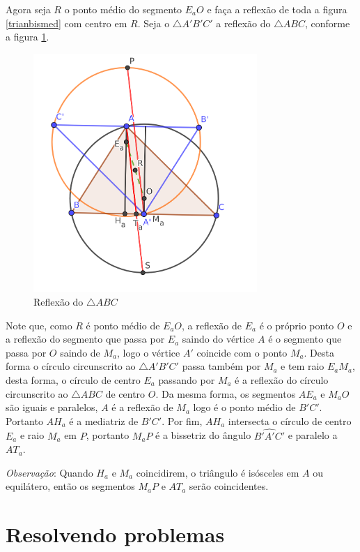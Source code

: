 \documentclass[12pt, openright, a4paper, brazil, openany, oneside]{abntex2}
\begin{document}
Agora seja $R$ o ponto médio do segmento $E_{a}O$ e faça a reflexão de toda a figura \ref{trianbismed} com centro em $R$. Seja o  $\triangle A'B'C'$ a reflexão do $\triangle ABC$, conforme a figura \ref{trianref}.

\begin{figure}[h]
	
	\center
	
	\includegraphics[width=8.5cm]{trianreflexao.png}
	\caption{Reflexão do $\triangle ABC$ \label{trianref}}
	
\end{figure}

Note que, como $R$ é ponto médio de $E_{a}O$, a reflexão de $E_a$ é o próprio ponto $O$ e a reflexão do segmento que passa por $E_a$ saindo do vértice $A$ é o segmento que passa por $O$ saindo de $M_a$, logo o vértice $A'$ coincide com o ponto $M_a$. Desta forma o círculo circunscrito ao $\triangle A'B'C'$ passa também por $M_a$ e tem raio $E_{a}M_{a}$, desta forma, o círculo de centro $E_a$ passando por $M_a$ é a reflexão do círculo circunscrito ao $\triangle ABC$ de centro $O$. Da mesma forma, os segmentos $AE_a$ e $M_{a}O$ são iguais e paralelos, $A$ é a reflexão de $M_a$ logo é o ponto médio de $B'C'$. Portanto $AH_a$ é a mediatriz de $B'C'$. Por fim, $AH_a$ intersecta o círculo de centro $E_a$ e raio $M_a$ em $P$, portanto $M_aP$ é a bissetriz do ângulo $\hat{B'A'C'}$ e paralelo a $AT_a$.

\textit{Observação}: Quando $H_a$ e $M_a$ coincidirem, o triângulo é isósceles em $A$ ou equilátero, então os segmentos $M_{a}P$ e $AT_a$ serão coincidentes.

\chapter{Resolvendo problemas}
\end{document}
